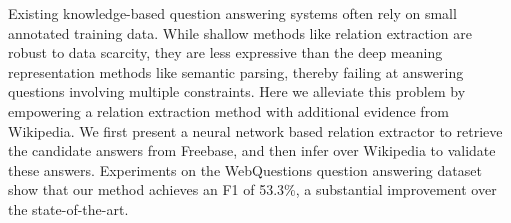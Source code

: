 Existing knowledge-based question answering systems often rely on small annotated training data. While shallow methods like relation extraction are robust to data scarcity, they are less expressive than the deep meaning representation methods like semantic parsing, thereby failing at answering questions involving multiple constraints. Here we alleviate this problem by empowering a relation extraction method with additional evidence from Wikipedia. We first present a neural network based relation extractor to retrieve the candidate answers from Freebase, and then infer over Wikipedia to validate these answers. Experiments on the WebQuestions question answering dataset show that our method achieves an F1 of 53.3\%, a substantial improvement over the state-of-the-art.
